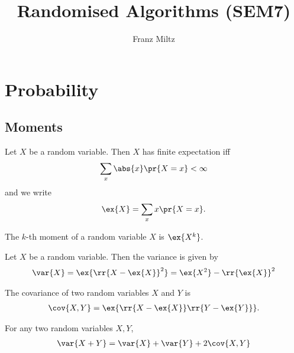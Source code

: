 \documentclass{article}
\title{Randomised Algorithms (SEM7)}
\author{Franz Miltz}
\begin{document}
\maketitle
\tableofcontents
\pagebreak

\section{Probability}


\subsection{Moments}

\begin{definition}
  \label{def:expectation}
  Let $X$ be a random variable. Then $X$ has finite expectation iff
  \begin{align*}
    \sum_{x} \abs{x} \pr{X=x} < \infty
  \end{align*}
  and we write
  \begin{align*}
    \ex{X} = \sum_{x} x \pr{X=x}.
  \end{align*}
\end{definition}

\begin{definition}
  \label{def:moment}
  The $k$-th moment of a random variable $X$ is $\ex{X^k}$.
\end{definition}

\begin{definition}
  \label{def:variance}
  Let $X$ be a random variable. Then the variance is given by
  \begin{align*}
    \var{X}=\ex{\rr{X-\ex{X}}^2} = \ex{X^2}-\rr{\ex{X}}^2
  \end{align*}
\end{definition}

\begin{definition}
  \label{def:covariance}
  The covariance of two random variables $X$ and $Y$ is
  \begin{align*}
    \cov{X,Y}=\ex{\rr{X-\ex{X}}\rr{Y-\ex{Y}}}.
  \end{align*}
\end{definition}

\begin{theorem}
  For any two random variables $X,Y$,
  \begin{align*}
    \var{X+Y}=\var{X}+\var{Y}+2\cov{X,Y}
  \end{align*}
\end{theorem}
\end{document}
